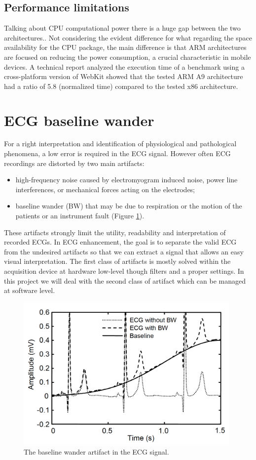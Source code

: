 \subsection{Performance limitations}
Talking about CPU computational power there is a huge gap between the two architectures.. Not considering the evident difference for what regarding the space availability for the CPU package, the main difference is that ARM architectures are focused on reducing the power consumption, a crucial characteristic in mobile devices. A technical report analyzed the execution time of a benchmark using a cross-platform version of WebKit showed that the tested ARM A9 architecture had a ratio of 5.8 (normalized time) compared to the tested x86 architecture.\cite{ref11}

\section{ECG baseline wander}
For a right interpretation and identification of physiological and pathological phenomena, a low error is required in the ECG signal. However often ECG recordings are distorted by two main artifacts:
\begin{itemize}
	\item high-frequency noise caused by electromyogram induced noise, power line interferences, or mechanical forces acting on the electrodes;
	\item baseline wander (BW) that may be due to respiration or the motion of the patients or an instrument fault (Figure \ref{fig6.5}).
\end{itemize}
These artifacts strongly limit the utility, readability and interpretation of recorded ECGs. In ECG enhancement, the goal is to separate the valid ECG from the undesired artifacts so that we can extract a signal that allows an easy visual interpretation.\cite{ref12}
The first class of artifacts is mostly solved within the acquisition device at hardware low-level though filters and a proper settings. In this project we will deal with the second class of artifact which can be managed at software level.
\begin{figure}[ht!]
	\centering
	\includegraphics[width=110mm]{figures/ch6/5.png}
	\caption{The baseline wander artifact in the ECG signal.}
	\label{fig6.5}
\end{figure}

